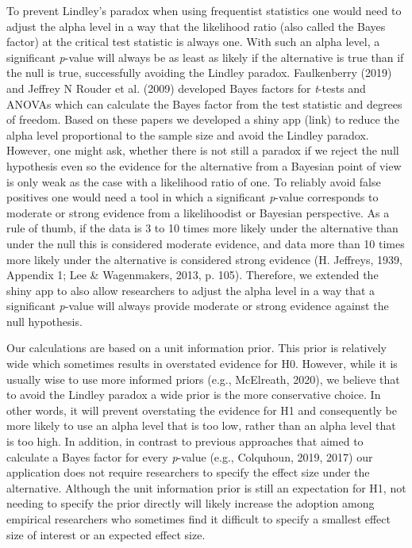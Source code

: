 \documentclass[
  english,
  ,jou,floatsintext]{apa6}
\begin{document}
To prevent Lindley's paradox when using frequentist statistics one would need to adjust the alpha level in a way that the likelihood ratio (also called the Bayes factor) at the critical test statistic is always one. With such an alpha level, a significant \emph{p}-value will always be as least as likely if the alternative is true than if the null is true, successfully avoiding the Lindley paradox. Faulkenberry (2019) and Jeffrey N Rouder et al. (2009) developed Bayes factors for \emph{t}-tests and ANOVAs which can calculate the Bayes factor from the test statistic and degrees of freedom.
Based on these papers we developed a shiny app (link) to reduce the alpha level proportional to the sample size and avoid the Lindley paradox. However, one might ask, whether there is not still a paradox if we reject the null hypothesis even so the evidence for the alternative from a Bayesian point of view is only weak as the case with a likelihood ratio of one. To reliably avoid false positives one would need a tool in which a significant \emph{p}-value corresponds to moderate or strong evidence from a likelihoodist or Bayesian perspective. As a rule of thumb, if the data is 3 to 10 times more likely under the alternative than under the null this is considered moderate evidence, and data more than 10 times more likely under the alternative is considered strong evidence (H. Jeffreys, 1939, Appendix 1; Lee \& Wagenmakers, 2013, p. 105). Therefore, we extended the shiny app to also allow researchers to adjust the alpha level in a way that a significant \emph{p}-value will always provide moderate or strong evidence against the null hypothesis.

Our calculations are based on a unit information prior. This prior is relatively wide which sometimes results in overstated evidence for H0. However, while it is usually wise to use more informed priors (e.g., McElreath, 2020), we believe that to avoid the Lindley paradox a wide prior is the more conservative choice. In other words, it will prevent overstating the evidence for H1 and consequently be more likely to use an alpha level that is too low, rather than an alpha level that is too high. In addition, in contrast to previous approaches that aimed to calculate a Bayes factor for every \emph{p}-value (e.g., Colquhoun, 2019, 2017) our application does not require researchers to specify the effect size under the alternative. Although the unit information prior is still an expectation for H1, not needing to specify the prior directly will likely increase the adoption among empirical researchers who sometimes find it difficult to specify a smallest effect size of interest or an expected effect size.
\end{document}
